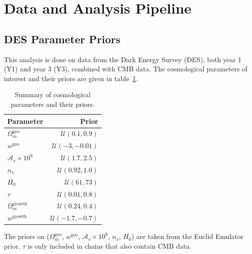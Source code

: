\section{Data and Analysis Pipeline}
\subsection{DES Parameter Priors}
This analysis is done on data from the Dark Energy Survey (DES), both year 1 (Y1) and year 3 (Y3), combined with CMB data. The cosmological parameters of interest and their priors are given in table~\ref{table:cosmo_prior}.
\begin{table}
\centering
\begin{tabular}{lr}
	\hline
	Parameter & Prior \\
	\hline\hline
	$\Omega_m^{\text{geo}}$    & $\mathcal{U}(0.1,0.9)$   \\
	$w^{\mathrm{geo}}$         & $\mathcal{U}(-3,-0.01)$  \\
	$\mathcal{A}_s\times10^9$  & $\mathcal{U}(1.7,2.5)$   \\
	$n_s$                      & $\mathcal{U}(0.92,1.0)$  \\
	$H_0$                      & $\mathcal{U}(61,73)$     \\
	$\tau$                     & $\mathcal{U}(0.01,0.8)$  \\
	$\Omega_m^{\text{growth}}$ & $\mathcal{U}(0.24,0.4)$  \\
	$w^{\mathrm{growth}}$      & $\mathcal{U}(-1.7,-0.7)$ \\
	\hline
\end{tabular}
\caption{Summary of cosmological parameters and their priors.}
\label{table:cosmo_prior}
\end{table}
The priors on ($\Omega_m^{\text{geo}}$, $w^{\mathrm{geo}}$, $\mathcal{A}_s\times10^9$, $n_s$, $H_0$) are taken from the Euclid Emulator prior. $\tau$ is only included in chains that also contain CMB data.
